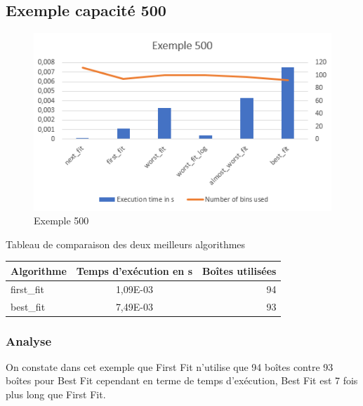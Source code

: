 \documentclass{article}
\begin{document}
\clearpage
\subsection{Exemple capacité 500}
\begin{figure}[h]
\begin{center}
\includegraphics{exemple500.png}
\end{center}
\caption{Exemple 500}
\end{figure}

\begin{center}
Tableau de comparaison des deux meilleurs algorithmes

\begin{tabular}{|l|c|r|}
  \hline
  Algorithme & Temps d'exécution en s & Boîtes utilisées \\
  \hline
  first\_fit & 1,09E-03 & 94 \\
  best\_fit & 7,49E-03  & 93 \\
  \hline
\end{tabular}
\end{center}

\subsubsection{Analyse}
On constate dans cet exemple que First Fit n'utilise que 94 boîtes contre 93 boîtes pour Best Fit cependant en terme de temps d'exécution,
Best Fit est 7 fois plus long que First Fit.

\clearpage
\end{document}
